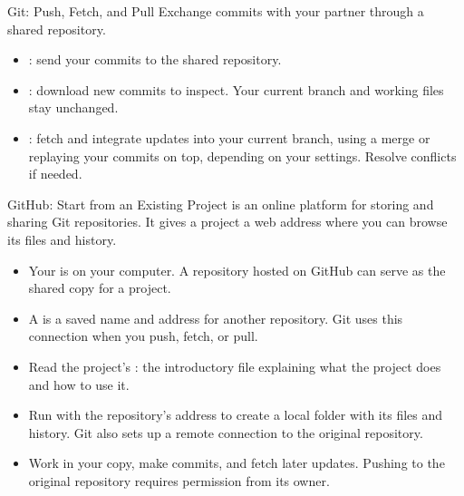 \begin{frame}{Git: Push, Fetch, and Pull}
\small
Exchange commits with your partner through a shared repository.
\par\smallskip
\begingroup\centering
{}
\par\endgroup\smallskip
\begin{itemize}
\item {}: send your commits to the shared repository.
\item {}: download new commits to inspect. Your current branch and working files stay unchanged.
\item {}: fetch and integrate updates into your current branch, using a merge or replaying your commits on top, depending on your settings. Resolve conflicts if needed.
\end{itemize}
\end{frame}

\begin{frame}{GitHub: Start from an Existing Project}
 is an online platform for storing and sharing Git repositories. It gives a project a web address where you can browse its files and history.
\par\medskip
\begin{itemize}
\item Your  is on your computer. A repository hosted on GitHub can serve as the shared copy for a project.
\item A  is a saved name and address for another repository. Git uses this connection when you push, fetch, or pull.
\item Read the project's : the introductory file explaining what the project does and how to use it.
\item Run  with the repository's address to create a local folder with its files and history. Git also sets up a remote connection to the original repository.
\item Work in your copy, make commits, and fetch later updates. Pushing to the original repository requires permission from its owner.
\end{itemize}
\end{frame}

